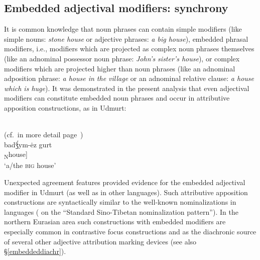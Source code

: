 \subsection{Embedded adjectival modifiers: synchrony}
\label{embeddedsynchr}
It is common knowledge that noun phrases can contain simple modifiers (like simple nouns: \textit{stone house} or adjective phrases: \textit{a big house}), embedded phrasal modifiers, i.e., modifiers which are projected as complex noun phrases themselves (like an adnominal possessor noun phrase: \textit{John's sister's house}), or complex modifiers which are projected higher than noun phrases (like an adnominal adposition phrase: \textit{a house in the village} or an adnominal relative clause: \textit{a house which is huge}). It was demonstrated in the present analysis that even adjectival modifiers can constitute embedded noun phrases and occur in attributive apposition constructions, as in Udmurt:
\begin{exe}
\\{\rm (cf.~in more detail page~\pageref{udmurt synchr})}\\
\gll	{}		{}		badǯ́ym-ėz gurt\\
	[\textsubscript{NP} 	[\textsubscript{NP'} \textsubscript{A}big-\textsc{nmlz}] \textsubscript{N}house]\\
\glt	‘a/the \textsc{big} house’
\end{exe}
Unexpected agreement features provided evidence for the embedded adjectival modifier in Udmurt (as well as in other languages). Such attributive apposition constructions are syntactically similar to the well-known nominalizations in  languages (\citealt[cf.][]{bickel1999} on the “Standard Sino-Tibetan nominalization pattern”). In the northern Eurasian area such constructions with embedded modifiers are especially  common in contrastive focus constructions and as the diachronic source of several other adjective attribution marking devices (see also \S\ref{embeddeddiachr}). 

